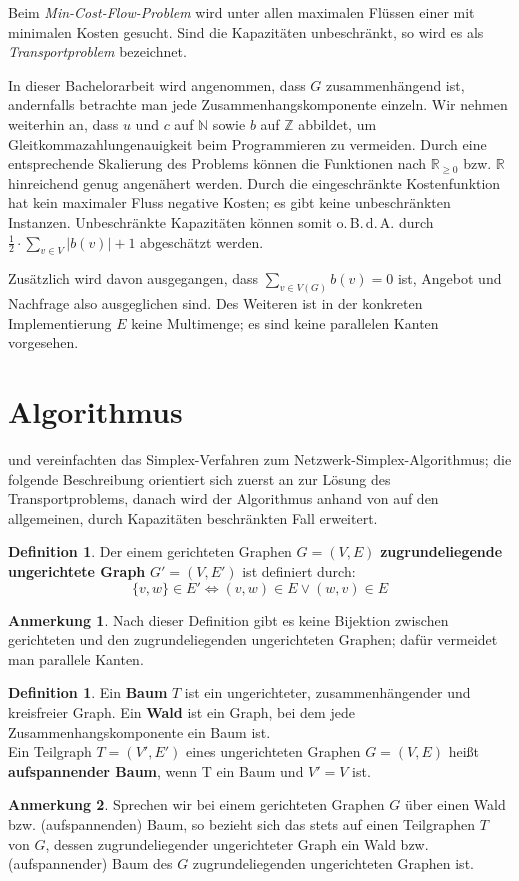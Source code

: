 \documentclass[a4paper,twoside,ngerman]{report}
\theoremstyle{plain}
\theoremstyle{definition}
\newtheorem{defn}[thm]{Definition}
\newtheorem*{anm}{Anmerkung}
\newcommand{\obda}{o.\,B.\,d.\,A. }
\begin{document}
Beim \emph{Min-Cost-Flow-Problem} wird unter allen maximalen Flüssen einer mit minimalen Kosten gesucht. Sind die Kapazitäten unbeschränkt, so wird es als \emph{Transportproblem} bezeichnet.

In dieser Bachelorarbeit wird angenommen, dass $G$ zusammenhängend ist, andernfalls betrachte man jede Zusammenhangskomponente einzeln. Wir nehmen weiterhin an, dass $u$ und $c$ auf $\mathbb{N}$ sowie $b$ auf $\mathbb{Z}$ abbildet, um Gleitkommazahlungenauigkeit beim Programmieren zu vermeiden. Durch eine entsprechende Skalierung des Problems können die Funktionen nach $\mathbb{R}_{\geq 0}$ bzw. $\mathbb{R}$ hinreichend genug angenähert werden. Durch die eingeschränkte Kostenfunktion hat kein maximaler Fluss negative Kosten; es gibt keine unbeschränkten Instanzen. Unbeschränkte Kapazitäten können somit \obda durch $\frac{1}{2}\cdot\sum_{v\in V} |b(v)| + 1$ abgeschätzt werden.

Zusätzlich wird davon ausgegangen, dass $\sum_{v\in V(G)} b(v) = 0$ ist, Angebot und Nachfrage also ausgeglichen sind. Des Weiteren ist in der konkreten Implementierung $E$ keine Multimenge; es sind keine parallelen Kanten vorgesehen.

\section{Algorithmus}
\cite[Dantzig, 1951]{erf1} und \cite[Orden, 1956]{erf2} vereinfachten das Simplex-Verfahren zum Netzwerk-Simplex-Algorithmus; die folgende Beschreibung orientiert sich zuerst an \cite[S. 291\,ff.]{NSAbook} zur Lösung des Transportproblems, danach wird der Algorithmus anhand von \cite[S. 353\,ff.]{NSAbook} auf den allgemeinen, durch Kapazitäten beschränkten Fall erweitert.

\begin{defn}Der einem gerichteten Graphen $G=(V,E)$ \textbf{zugrundeliegende ungerichtete Graph} $G'=(V,E')$ ist definiert durch:
\begin{equation*}\{v,w\}\in E' \iff (v,w) \in E \lor (w,v) \in E\end{equation*} \end{defn}
\begin{anm}Nach dieser Definition gibt es keine Bijektion zwischen gerichteten und den zugrundeliegenden ungerichteten Graphen; dafür vermeidet man parallele Kanten.\end{anm}
\begin{defn}Ein \textbf{Baum} $T$ ist ein ungerichteter, zusammenhängender und kreisfreier Graph. Ein \textbf{Wald} ist ein Graph, bei dem jede Zusammenhangskomponente ein Baum ist.\\
Ein Teilgraph $T=(V',E')$ eines ungerichteten Graphen $G=(V,E)$ heißt \textbf{aufspannender Baum}, wenn T ein Baum und $V'=V$ ist.\end{defn}
\begin{anm}Sprechen wir bei einem gerichteten Graphen $G$ über einen Wald bzw. (aufspannenden) Baum, so bezieht sich das stets auf einen Teilgraphen $T$ von $G$, dessen zugrundeliegender ungerichteter Graph ein Wald bzw. (aufspannender) Baum des $G$ zugrundeliegenden ungerichteten Graphen ist.\end{anm}
\end{document}
